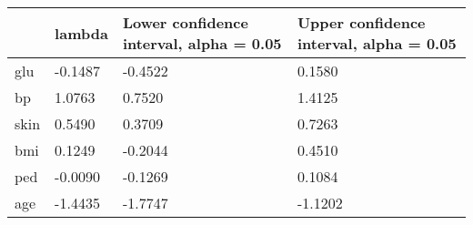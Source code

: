 \begin{tabular}{p{4cm}|p{3cm}|p{3cm}|p{3cm}}
\toprule
{} &  lambda &  Lower confidence interval, alpha = 0.05 &  Upper confidence interval, alpha = 0.05 \\
\midrule
glu  & -0.1487 &                                  -0.4522 &                                   0.1580 \\
bp   &  1.0763 &                                   0.7520 &                                   1.4125 \\
skin &  0.5490 &                                   0.3709 &                                   0.7263 \\
bmi  &  0.1249 &                                  -0.2044 &                                   0.4510 \\
ped  & -0.0090 &                                  -0.1269 &                                   0.1084 \\
age  & -1.4435 &                                  -1.7747 &                                  -1.1202 \\
\bottomrule
\end{tabular}
